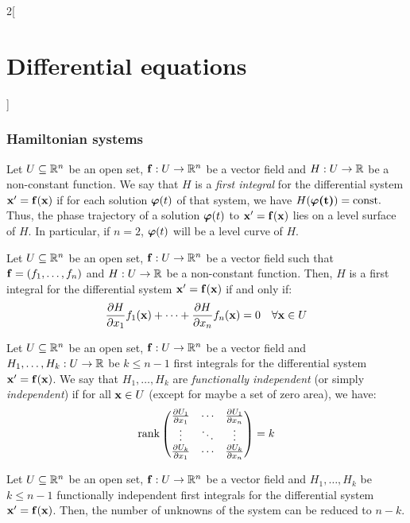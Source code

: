 \documentclass[../../../main.tex]{subfiles}
\begin{document}
\begin{multicols}{2}[\section{Differential equations}]
  \subsubsection{Hamiltonian systems}
  \begin{definition}
    Let $U\subseteq \mathbb{R}^n$ be an open set, $\boldsymbol{\mathrm{f}}:U\rightarrow\mathbb{R}^n$ be a vector field and $H:U\rightarrow\mathbb{R}$ be a non-constant function. We say that $H$ is a \emph{first integral} for the differential system $\boldsymbol{\mathrm{x}}'=\boldsymbol{\mathrm{f}}(\boldsymbol{\mathrm{x}})$ if for each solution $\boldsymbol{\mathrm{\varphi}}(t)$ of that system, we have $H(\boldsymbol{\mathrm{\varphi(t)}})=\text{const.}$ Thus, the phase trajectory of a solution $\boldsymbol{\mathrm{\varphi}}(t)$ to $\boldsymbol{\mathrm{x}}'=\boldsymbol{\mathrm{f}}(\boldsymbol{\mathrm{x}})$ lies on a level surface of $H$. In particular, if $n=2$, $\boldsymbol{\mathrm{\varphi}}(t)$ will be a level curve of $H$.
  \end{definition}
  \begin{proposition}
    Let $U\subseteq \mathbb{R}^n$ be an open set, $\boldsymbol{\mathrm{f}}:U\rightarrow\mathbb{R}^n$ be a vector field such that $\boldsymbol{\mathrm{f}}=(f_1,\ldots,f_n)$ and $H:U\rightarrow\mathbb{R}$ be a non-constant function. Then, $H$ is a first integral for the differential system $\boldsymbol{\mathrm{x}}'=\boldsymbol{\mathrm{f}}(\boldsymbol{\mathrm{x}})$ if and only if: $$\pdv{H}{x_1}(\boldsymbol{\mathrm{x}})f_1(\boldsymbol{\mathrm{\boldsymbol{\mathrm{x}}}})+\cdots+\pdv{H}{x_n}(\boldsymbol{\mathrm{x}})f_n(\boldsymbol{\mathrm{\boldsymbol{\mathrm{x}}}})=0\quad\forall\boldsymbol{\mathrm{x}}\in U$$
  \end{proposition}
  \begin{definition}
    Let $U\subseteq \mathbb{R}^n$ be an open set, $\boldsymbol{\mathrm{f}}:U\rightarrow\mathbb{R}^n$ be a vector field and $H_1,\ldots,H_k:U\rightarrow\mathbb{R}$ be $k\leq n-1$ first integrals for the differential system $\boldsymbol{\mathrm{x}}'=\boldsymbol{\mathrm{f}}(\boldsymbol{\mathrm{x}})$. We say that $H_1,\ldots,H_k$ are \emph{functionally independent} (or simply \emph{independent}) if for all $\boldsymbol{\mathrm{x}}\in U$ (except for maybe a set of zero area), we have: $$\rank
      \begin{pmatrix}
        \pdv{U_1}{x_1}(\boldsymbol{\mathrm{x}}) & \cdots & \pdv{U_1}{x_n}(\boldsymbol{\mathrm{x}}) \\
        \vdots                 & \ddots & \vdots                 \\
        \pdv{U_k}{x_1}(\boldsymbol{\mathrm{x}}) & \cdots & \pdv{U_k}{x_n}(\boldsymbol{\mathrm{x}}) \\
      \end{pmatrix}=k$$
  \end{definition}
  \begin{proposition}
    Let $U\subseteq \mathbb{R}^n$ be an open set, $\boldsymbol{\mathrm{f}}:U\rightarrow\mathbb{R}^n$ be a vector field and $H_1,\ldots,H_k$ be $k\leq n-1$ functionally independent first integrals for the differential system $\boldsymbol{\mathrm{x}}'=\boldsymbol{\mathrm{f}}(\boldsymbol{\mathrm{x}})$. Then, the number of unknowns of the system can be reduced to $n-k$.

\end{proposition}
\end{multicols}
\end{document}
